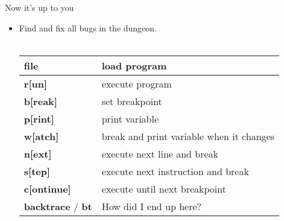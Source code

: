 \begin{frame}{Now it's up to you}
	\begin{itemize}
		\item Find and fix all bugs in the dungeon.\\\ \\
		\begin{tabular}{|l|l|}
			\hline
			\textbf{file} & load program\\\hline
			\textbf{r[un]} & execute program\\\hline
			\textbf{b[reak]} & set breakpoint\\\hline
			\textbf{p[rint]} & print variable\\\hline
			\textbf{w[atch]} & break and print variable when it changes\\\hline
			\textbf{n[ext]} & execute next line and break\\\hline
			\textbf{s[tep]} & execute next instruction and break\\\hline
			\textbf{c[ontinue]} & execute until next breakpoint\\\hline
			\textbf{backtrace} / \textbf{bt} & How did I end up here?\\\hline
		\end{tabular}
	\end{itemize}
\end{frame}

